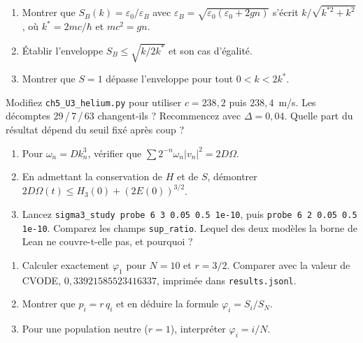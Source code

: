 \begin{exercise}[U3, démonstration]\label{ch5:ex:U3a}
\begin{enumerate}
\item Montrer que $S_B(k)=\varepsilon_0/\varepsilon_B$ avec $\varepsilon_B=\sqrt{\varepsilon_0(\varepsilon_0+2gn)}$
s'écrit $k/\sqrt{k^{*2}+k^2}$, où $k^*=2mc/\hbar$ et $mc^2=gn$.
\item Établir l'enveloppe $S_B\le\sqrt{k/2k^*}$ et son cas d'égalité.
\item Montrer que $S=1$ dépasse l'enveloppe pour tout $0<k<2k^*$.
\end{enumerate}
\end{exercise}

\begin{exercise}[U3, (S)]\label{ch5:ex:U3b}
Modifiez \texttt{ch5\_U3\_helium.py} pour utiliser $c=238{,}2$ puis $238{,}4$~m/s. Les décomptes
29\,/\,7\,/\,63 changent-ils ? Recommencez avec $\Delta=0{,}04$. Quelle part du résultat dépend du seuil fixé après
coup ?
\end{exercise}

\begin{exercise}[U4, démonstration et (S)]\label{ch5:ex:U4}
\begin{enumerate}
\item Pour $\omega_n=Dk_n^3$, vérifier que $\sum2^{-n}\omega_n|v_n|^2=2D\Omega$.
\item En admettant la conservation de $H$ et de $S$, démontrer $2D\Omega(t)\le H_3(0)+(2E(0))^{3/2}$.
\item Lancez \texttt{sigma3\_study probe 6 3 0.05 0.5 1e-10}, puis \texttt{probe 6 2 0.05 0.5 1e-10}. Comparez les
champs \texttt{sup\_ratio}. Lequel des deux modèles la borne de Lean ne couvre-t-elle pas, et pourquoi ?
\end{enumerate}
\end{exercise}

\begin{exercise}[U5, calcul]\label{ch5:ex:U5a}
\begin{enumerate}
\item Calculer exactement $\varphi_1$ pour $N=10$ et $r=3/2$. Comparer avec la valeur de CVODE,
$0{,}33921585523416337$, imprimée dans \texttt{results.jsonl}.
\item Montrer que $p_i=r\,q_i$ et en déduire la formule $\varphi_i=S_i/S_N$.
\item Pour une population neutre ($r=1$), interpréter $\varphi_i=i/N$.
\end{enumerate}
\end{exercise}

